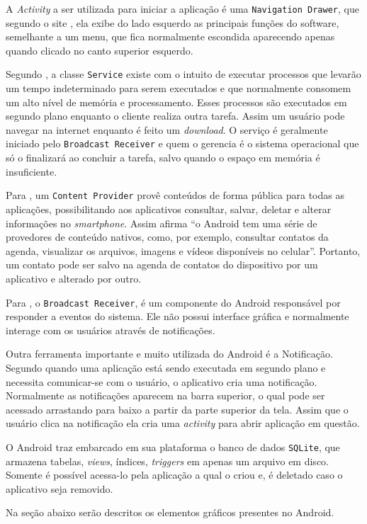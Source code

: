 	\par A \textit{Activity} a ser utilizada para iniciar a aplicação é uma
\texttt{Navigation Drawer}, que segundo o site , ela exibe
do lado esquerdo as principais funções do software, semelhante a um
menu, que fica normalmente escondida aparecendo apenas quando clicado no canto
superior esquerdo. 

	\par Segundo , a classe \texttt{Service} existe com o intuito
de executar processos que levarão um tempo indeterminado para serem executados
e que normalmente consomem um alto nível de memória e processamento. Esses
processos são executados em segundo plano enquanto o cliente realiza outra
tarefa. Assim um usuário pode navegar na internet enquanto é feito um
\textit{download}. O serviço é geralmente iniciado pelo \texttt{Broadcast Receiver} e
quem o gerencia é o sistema operacional que só o finalizará ao concluir a
tarefa, salvo quando o espaço em memória é insuficiente.

	\par Para , um \texttt{Content Provider} provê conteúdos de
forma pública para todas as aplicações, possibilitando aos aplicativos consultar,
salvar, deletar e alterar informações no \textit{smartphone}. Assim afirma
 “o Android tem uma série de provedores de
conteúdo nativos, como, por exemplo, consultar contatos da agenda, visualizar
os arquivos, imagens e vídeos disponíveis no celular”. Portanto, um contato
pode ser salvo na agenda de contatos do dispositivo por um aplicativo e
alterado por outro.

	\par Para , o \texttt{Broadcast Receiver},
é um componente do Android responsável por responder a eventos do sistema.
Ele não possui interface gráfica e normalmente interage com os usuários através
de notificações.

	\par Outra ferramenta importante e muito utilizada do Android é a Notificação.
Segundo  quando uma aplicação está sendo
executada em segundo plano e necessita comunicar-se com o usuário, o aplicativo
cria uma notificação. Normalmente as notificações aparecem na barra superior, o
qual pode ser acessado arrastando para baixo a partir da parte superior da
tela. Assim que o usuário clica na notificação ela cria uma \textit{activity}
para abrir  aplicação em questão.

	\par O Android traz embarcado em sua plataforma o banco de dados
\texttt{SQLite}, que armazena tabelas, \textit{views}, índices,
\textit{triggers} em apenas um arquivo em disco. Somente é possível acessa-lo
pela aplicação a qual o criou e, é deletado caso o aplicativo seja removido.

	\par Na seção abaixo serão descritos os elementos gráficos presentes no
Android.

	
